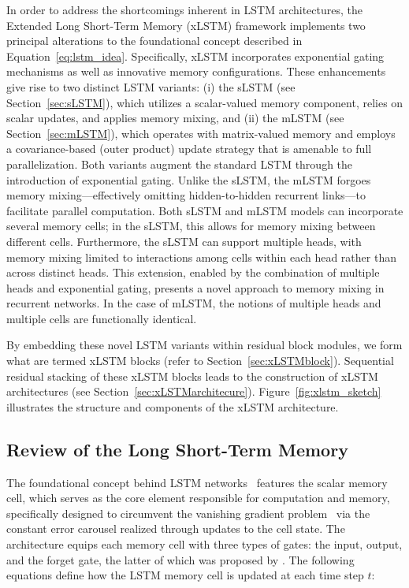 In order to address the shortcomings inherent in LSTM architectures, the Extended Long Short-Term Memory (xLSTM) framework implements two principal alterations to the foundational concept described in Equation~\eqref{eq:lstm_idea}. Specifically, xLSTM incorporates exponential gating mechanisms as well as innovative memory configurations. These enhancements give rise to two distinct LSTM variants: (i) the sLSTM (see Section~\ref{sec:sLSTM}), which utilizes a scalar-valued memory component, relies on scalar updates, and applies memory mixing, and (ii) the mLSTM (see Section~\ref{sec:mLSTM}), which operates with matrix-valued memory and employs a covariance-based (outer product) update strategy that is amenable to full parallelization. Both variants augment the standard LSTM through the introduction of exponential gating. Unlike the sLSTM, the mLSTM forgoes memory mixing—effectively omitting hidden-to-hidden recurrent links—to facilitate parallel computation. Both sLSTM and mLSTM models can incorporate several memory cells; in the sLSTM, this allows for memory mixing between different cells. Furthermore, the sLSTM can support multiple heads, with memory mixing limited to interactions among cells within each head rather than across distinct heads. This extension, enabled by the combination of multiple heads and exponential gating, presents a novel approach to memory mixing in recurrent networks. In the case of mLSTM, the notions of multiple heads and multiple cells are functionally identical.

By embedding these novel LSTM variants within residual block modules, we form what are termed xLSTM blocks (refer to Section~\ref{sec:xLSTMblock}). Sequential residual stacking of these xLSTM blocks leads to the construction of xLSTM architectures (see Section~\ref{sec:xLSTMarchitecure}). Figure~\ref{fig:xlstm_sketch} illustrates the structure and components of the xLSTM architecture.

\subsection{Review of the Long Short-Term Memory}
\label{sec:orgLSTM}

The foundational concept behind LSTM networks~\citep{Hochreiter:91,Hochreiter:97nips,Hochreiter:97} features the scalar memory cell, which serves as the core element responsible for computation and memory, specifically designed to circumvent the vanishing gradient problem~\citep{Hochreiter:91,Hochreiter:00book} via the constant error carousel realized through updates to the cell state. The architecture equips each memory cell with three types of gates: the input, output, and the forget gate, the latter of which was proposed by \citet{Gers:00}. The following equations define how the LSTM memory cell is updated at each time step $t$:

